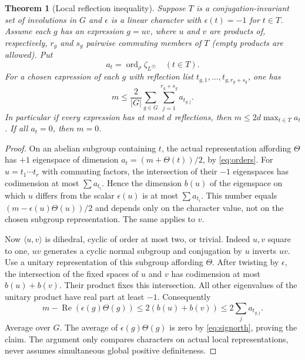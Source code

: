 \documentclass[11pt]{article}
\newtheorem{theorem}{Theorem}[section]
\theoremstyle{remark}\newtheorem{remark}[theorem]{Remark}
\newcommand{\ord}{\operatorname{ord}}
\newcommand{\Rea}{\operatorname{Re}}
\begin{document}
\begin{theorem}[Local reflection inequality]\label{thm:general}
Suppose $T$ is a conjugation-invariant set of involutions in $G$ and $\epsilon$ is a linear character with $\epsilon(t)=-1$ for $t\in T$. Assume each $g$ has an expression $g=uv$, where $u$ and $v$ are products of, respectively, $r_g$ and $s_g$ pairwise commuting members of $T$ (empty products are allowed). Put
\[
 a_t=\ord_\rho\zeta_{L^{\langle t\rangle}}\quad(t\in T).
\]
For a chosen expression of each $g$ with reflection list $t_{g,1},\dots,t_{g,r_g+s_g}$, one has
\begin{equation}\label{eq:weighted}
 m\le \frac{2}{|G|}\sum_{g\in G}\sum_{j=1}^{r_g+s_g}a_{t_{g,j}}.
\end{equation}
In particular if every expression has at most $d$ reflections, then $m\le2d\max_{t\in T}a_t$. If all $a_t=0$, then $m=0$.
\end{theorem}
\begin{proof}
On an abelian subgroup containing $t$, the actual representation affording $\Theta$ has $+1$ eigenspace of dimension $a_t=(m+\Theta(t))/2$, by \eqref{eq:orders}. For $u=t_1\cdots t_r$ with commuting factors, the intersection of their $-1$ eigenspaces has codimension at most $\sum a_{t_i}$. Hence the dimension $b(u)$ of the eigenspace on which $u$ differs from the scalar $\epsilon(u)$ is at most $\sum a_{t_i}$. This number equals $(m-\epsilon(u)\Theta(u))/2$ and depends only on the character value, not on the chosen subgroup representation. The same applies to $v$.

Now $\langle u,v\rangle$ is dihedral, cyclic of order at most two, or trivial. Indeed $u,v$ square to one, $uv$ generates a cyclic normal subgroup and conjugation by $u$ inverts $uv$. Use a unitary representation of this subgroup affording $\Theta$. After twisting by $\epsilon$, the intersection of the fixed spaces of $u$ and $v$ has codimension at most $b(u)+b(v)$. Their product fixes this intersection. All other eigenvalues of the unitary product have real part at least $-1$. Consequently
\[
 m-\Rea(\epsilon(g)\Theta(g))\le2(b(u)+b(v))
 \le2\sum_j a_{t_{g,j}}.
\]
Average over $G$. The average of $\epsilon(g)\Theta(g)$ is zero by \eqref{eq:signorth}, proving the claim. The argument only compares characters on actual local representations, never assumes simultaneous global positive definiteness.
\end{proof}
\end{document}
